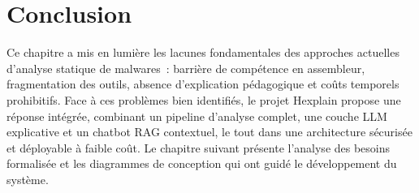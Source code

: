 \section{Conclusion}

Ce chapitre a mis en lumière les lacunes fondamentales des approches actuelles d'analyse statique de malwares~: barrière de compétence en assembleur, fragmentation des outils, absence d'explication pédagogique et coûts temporels prohibitifs. Face à ces problèmes bien identifiés, le projet Hexplain propose une réponse intégrée, combinant un pipeline d'analyse complet, une couche LLM explicative et un chatbot RAG contextuel, le tout dans une architecture sécurisée et déployable à faible coût. Le chapitre suivant présente l'analyse des besoins formalisée et les diagrammes de conception qui ont guidé le développement du système.
